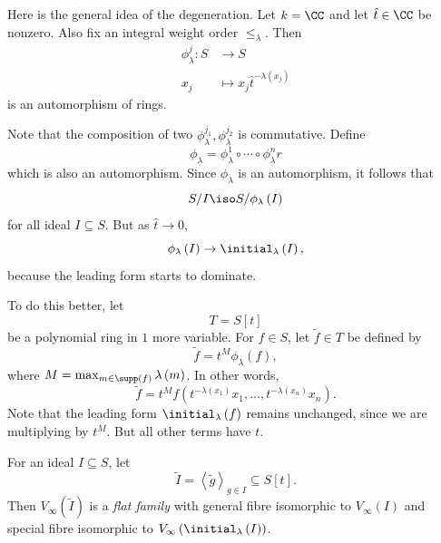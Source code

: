 \documentclass[co439]{subfiles}
\begin{document}
    \np Here is the general idea of the degeneration. Let $k=\CC$ and let $\hat{t}\in\CC$ be nonzero. Also fix an integral weight order $\leq_{\lambda}$. Then
    \begin{equation*}
        \begin{aligned}
            \phi_{\lambda}^j: S&\to S \\
            x_j & \mapsto x_j\hat{t}^{-\lambda\left( x_j \right)}
        \end{aligned} 
    \end{equation*}
    is an automorphism of rings.

    Note that the composition of two $\phi_{\lambda}^{j_1},\phi_{\lambda}^{j_2}$ is commutative. Define
    \begin{equation*}
        \phi_{\lambda} = \phi_{\lambda}^1 \circ \cdots \circ \phi_{\lambda}^nr
    \end{equation*}
    which is also an automorphism. Since $\phi_{\lambda}$ is an automorphism, it follows that
    \begin{equation*}
        S /I \iso S /\phi_{\lambda}\left( I \right)
    \end{equation*}
    for all ideal $I\subseteq S$. But as $\hat{t}\to 0$, 
    \begin{equation*}
        \phi_{\lambda}\left( I \right) \to \initial_{\lambda}\left( I \right),
    \end{equation*}
    because the leading form starts to dominate.

    To do this better, let
    \begin{equation*}
        T = S\left[ t \right]
    \end{equation*}
    be a polynomial ring in $1$ more variable. For $f\in S$, let $\tilde{f}\in T$ be defined by
    \begin{equation*}
        \tilde{f} = t^M\phi_{\lambda}\left( f \right),
    \end{equation*}
    where $M = \max_{m\in\supp\left( f \right)} \lambda\left( m \right)$. In other words,
    \begin{equation*}
        \tilde{f} = t^Mf\left( t^{-\lambda\left( x_1 \right)}x_1, \ldots, t^{-\lambda\left( x_n \right)}x_n \right).
    \end{equation*}
    Note that the leading form $\initial_{\lambda}\left( f \right)$ remains unchanged, since we are multiplying by $t^{M}$. But all other terms have $t$. 

    For an ideal $I\subseteq S$, let
    \begin{equation*}
        \tilde{I} = \left< \tilde{g} \right>_{g\in I} \subseteq S\left[ t \right]. 
    \end{equation*}
    Then $V_{\infty}\left( \tilde{I} \right)$ is a \emph{flat family} with general fibre isomorphic to $V_{\infty}\left( I \right)$ and special fibre isomorphic to $V_{\infty}\left( \initial_{\lambda}\left( I \right) \right)$.
\end{document}
